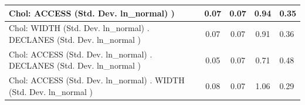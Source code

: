 \begin{table}
\begin{center}
\begin{tabular}{|l|l|c|c|c|l|}
			\hline
			 Chol: ACCESS (Std. Dev. ln_normal) ) &  & 0.07 & 0.07 & 0.94 & 0.35 \\
			\hline
			 Chol: WIDTH (Std. Dev. ln_normal) . DECLANES (Std. Dev.   ln_normal ) &  & 0.07 & 0.07 & 0.91 & 0.36 \\
			\hline
			 Chol: ACCESS (Std. Dev. ln_normal) . DECLANES (Std. Dev.   ln_normal ) &  & 0.05 & 0.07 & 0.71 & 0.48 \\
			\hline
			 Chol: ACCESS (Std. Dev. ln_normal) . WIDTH (Std. Dev.   ln_normal ) &  & 0.08 & 0.07 & 1.06 & 0.29 \\
			\hline
		\end{tabular}
	\end{center}
\end{table}